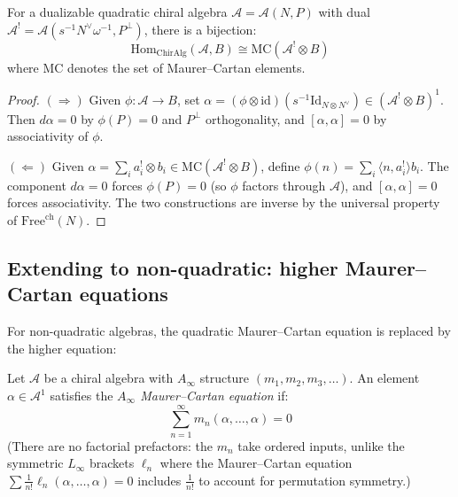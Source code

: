 \begin{theorem}
\label{thm:mc-quadratic}
For a dualizable quadratic chiral algebra $\mathcal{A} = \mathcal{A}(N, P)$ with dual $\mathcal{A}^! = \mathcal{A}(s^{-1}N^{\vee}\omega^{-1}, P^{\perp})$, there is a bijection:
\[
\text{Hom}_{\text{ChirAlg}}(\mathcal{A}, B) \cong \text{MC}(\mathcal{A}^! \otimes B)
\]
where $\text{MC}$ denotes the set of Maurer--Cartan elements.
\end{theorem}

\begin{proof}
\emph{$(\Rightarrow)$}\enspace
Given $\phi\colon \mathcal{A} \to B$, set
$\alpha = (\phi \otimes \mathrm{id})(s^{-1}\mathrm{Id}_{N \otimes N^\vee}) \in (\mathcal{A}^! \otimes B)^1$.
Then $d\alpha = 0$ by $\phi(P) = 0$ and $P^\perp$ orthogonality, and
$[\alpha,\alpha] = 0$ by associativity of $\phi$.

\emph{$(\Leftarrow)$}\enspace
Given $\alpha = \sum_i a_i^! \otimes b_i \in \mathrm{MC}(\mathcal{A}^! \otimes B)$,
define $\phi(n) = \sum_i \langle n, a_i^!\rangle b_i$.
The component $d\alpha = 0$ forces $\phi(P) = 0$ (so $\phi$ factors through $\mathcal{A}$),
and $[\alpha,\alpha] = 0$ forces associativity.
The two constructions are inverse by the universal property of $\mathrm{Free}^{\mathrm{ch}}(N)$. \qedhere
\end{proof}

\subsection{Extending to non-quadratic: higher Maurer--Cartan equations}

For non-quadratic algebras, the quadratic Maurer--Cartan equation is
replaced by the higher equation:

\begin{definition}
Let $\mathcal{A}$ be a chiral algebra with
$A_\infty$ structure $(m_1, m_2, m_3, \ldots)$.
An element $\alpha \in \mathcal{A}^1$ satisfies the
\emph{$A_\infty$ Maurer--Cartan equation} if:
\[
\sum_{n=1}^{\infty} m_n(\alpha, \ldots, \alpha) = 0
\]
(There are no factorial prefactors: the $m_n$ take ordered inputs, unlike the
symmetric $L_\infty$ brackets $\ell_n$ where the Maurer--Cartan equation
$\sum \frac{1}{n!}\ell_n(\alpha,\ldots,\alpha) = 0$ includes $\frac{1}{n!}$
to account for permutation symmetry.)
\end{definition}

